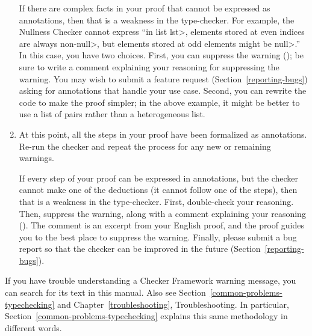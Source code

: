 \begin{enumerate}
  If there are complex facts in your proof that cannot be expressed as
  annotations, then that is a weakness in the type-checker.  For example,
  the Nullness Checker cannot express ``in list \<lst>, elements stored at
  even indices are always non-\<null>, but elements stored at odd elements
  might be \<null>.''  In this case, you have two choices.
  First, you can suppress the warning
  (); be sure to write a comment
  explaining your reasoning for suppressing the warning.  You may wish to
  submit a feature request (Section~\ref{reporting-bugs}) asking for
  annotations that handle your use case.
  Second, you can rewrite the code to make the proof simpler;
  in the above example, it might be better to use a list of pairs
  rather than a heterogeneous list.

\item
  At this point, all the steps in your proof have been formalized as
  annotations.  Re-run the checker and repeat the process for any new or
  remaining warnings.

  If every step of your proof can be expressed in annotations, but the
  checker cannot make one of the deductions (it cannot follow one of the
  steps), then that is a weakness in the type-checker.  First, double-check
  your reasoning.  Then, suppress the warning, along with a comment
  explaining your reasoning ().
  The comment is an excerpt from your English proof, and the proof guides
  you to the best place to suppress the warning.
  Finally, please submit a bug report so that the checker can be improved
  in the future (Section~\ref{reporting-bugs}).

\end{enumerate}

If you have trouble understanding a Checker Framework warning message, you
can search for its text in this manual.  Also see
Section~\ref{common-problems-typechecking} and
Chapter~\ref{troubleshooting}, Troubleshooting.
In particular, Section~\ref{common-problems-typechecking} explains this
same methodology in different words.



